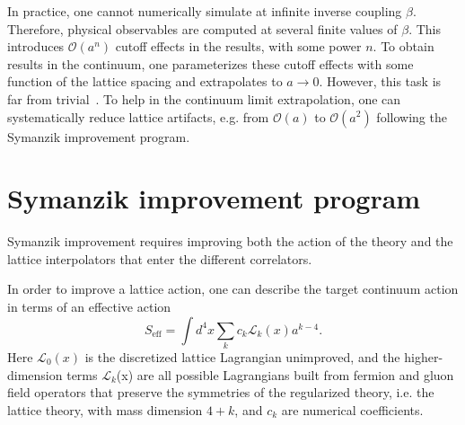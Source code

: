 In practice, one cannot numerically simulate at infinite inverse coupling $\beta$. Therefore, physical observables are computed at several finite values of $\beta$. This introduces $\mathcal{O}(a^n)$ cutoff effects in the results, with some power $n$. To obtain results in the continuum, one parameterizes these cutoff effects with some function of the lattice spacing and extrapolates to $a\rightarrow 0$. However, this task is far from trivial~\cite{}. To help in the continuum limit extrapolation, one can systematically reduce lattice artifacts, e.g. from $\mathcal{O}(a)$ to $\mathcal{O}(a^2)$ following the Symanzik improvement program. 


\section{Symanzik improvement program}
\label{ch_foundation:sec:impr}

Symanzik improvement requires improving both the action of the theory and the lattice interpolators that enter the different correlators. 

In order to improve a lattice action, one can describe the target continuum action in terms of an effective action
\begin{equation}
S_{\textrm{eff}}=\int d^4x\sum_kc_k\mathcal{L}_k(x)a^{k-4}.
\end{equation}
Here $\mathcal{L}_0(x)$ is the discretized lattice Lagrangian unimproved, and the higher-dimension terms $\mathcal{L}_k$(x) are all possible Lagrangians built from fermion and gluon field operators that preserve the symmetries of the regularized theory, i.e. the lattice theory, with mass dimension $4+k$, and $c_k$ are numerical coefficients.

